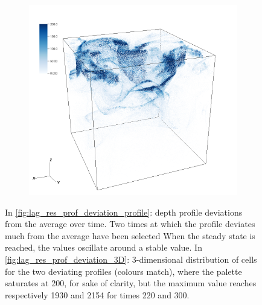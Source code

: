 \begin{figure}[ht]
\begin{subfigure}[b]{0.3\textwidth}
\begin{minipage}[t]{\linewidth}
        \end{minipage} \quad
        \begin{minipage}[t]{\linewidth}
        \includegraphics[width=\textwidth]{data/3D_model/run2/positions_150_coloured}
        \end{minipage}
        \caption{}
        \label{fig:lag_res_prof_deviation_3D}
    \end{subfigure}
    \caption{In \autoref{fig:lag_res_prof_deviation_profile}: depth profile deviations from the average over time. Two times at which the profile deviates much from the average have been selected When the steady state is reached, the values oscillate around a stable value. In \autoref{fig:lag_res_prof_deviation_3D}: 3-dimensional distribution of cells for the two deviating profiles (colours match), where the palette saturates at 200, for sake of clarity, but the maximum value reaches respectively 1930 and 2154 for times 220 and 300.}
    \label{fig:lag_res_prof_deviation}
\end{figure}


